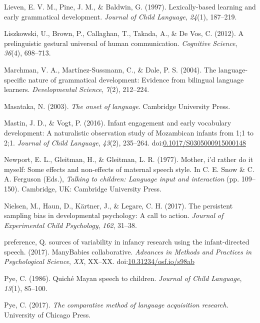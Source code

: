 \documentclass[floatsintext,man]{apa6}
\theoremstyle{definition}
\theoremstyle{definition}
\theoremstyle{definition}
\theoremstyle{remark}
\begin{document}
\hypertarget{ref-lieven1997lexically}{}
Lieven, E. V. M., Pine, J. M., \& Baldwin, G. (1997). Lexically-based
learning and early grammatical development. \emph{Journal of Child
Language}, \emph{24}(1), 187--219.

\hypertarget{ref-liszkowski2012prelinguistic}{}
Liszkowski, U., Brown, P., Callaghan, T., Takada, A., \& De Vos, C.
(2012). A prelinguistic gestural universal of human communication.
\emph{Cognitive Science}, \emph{36}(4), 698--713.

\hypertarget{ref-marchman2004language}{}
Marchman, V. A., Martínez-Sussmann, C., \& Dale, P. S. (2004). The
language-specific nature of grammatical development: Evidence from
bilingual language learners. \emph{Developmental Science}, \emph{7}(2),
212--224.

\hypertarget{ref-masataka2003onset}{}
Masataka, N. (2003). \emph{The onset of language}. Cambridge University
Press.

\hypertarget{ref-mastin2016infant}{}
Mastin, J. D., \& Vogt, P. (2016). Infant engagement and early
vocabulary development: A naturalistic observation study of Mozambican
infants from 1;1 to 2;1. \emph{Journal of Child Language}, \emph{43}(2),
235--264.
doi:\href{https://doi.org/0.1017/S0305000915000148}{0.1017/S0305000915000148}

\hypertarget{ref-newport1977mother}{}
Newport, E. L., Gleitman, H., \& Gleitman, L. R. (1977). Mother, i'd
rather do it myself: Some effects and non-effects of maternal speech
style. In C. E. Snow \& C. A. Ferguson (Eds.), \emph{Talking to
children: Language input and interaction} (pp. 109--150). Cambridge, UK:
Cambridge University Press.

\hypertarget{ref-nielsen2017persistent}{}
Nielsen, M., Haun, D., Kärtner, J., \& Legare, C. H. (2017). The
persistent sampling bias in developmental psychology: A call to action.
\emph{Journal of Experimental Child Psychology}, \emph{162}, 31--38.

\hypertarget{ref-manybabies2017}{}
preference, Q. sources of variability in infancy research using the
infant-directed speech. (2017). ManyBabies collaborative. \emph{Advances
in Methods and Practices in Psychological Science}, \emph{XX}, XX--XX.
doi:\href{https://doi.org/10.31234/osf.io/s98ab}{10.31234/osf.io/s98ab}

\hypertarget{ref-pye1986quiche}{}
Pye, C. (1986). Quiché Mayan speech to children. \emph{Journal of Child
Language}, \emph{13}(1), 85--100.

\hypertarget{ref-pye2017comparative}{}
Pye, C. (2017). \emph{The comparative method of language acquisition
research}. University of Chicago Press.
\end{document}
